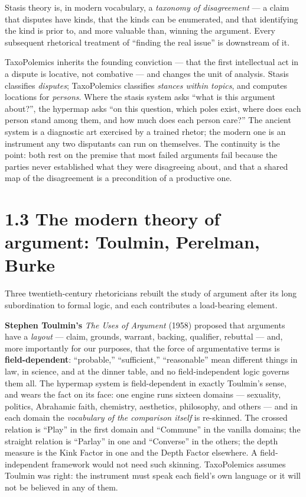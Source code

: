 Stasis theory is, in modern vocabulary, a \emph{taxonomy of
disagreement} --- a claim that disputes have kinds, that the kinds can
be enumerated, and that identifying the kind is prior to, and more
valuable than, winning the argument. Every subsequent rhetorical
treatment of ``finding the real issue'' is downstream of it.

TaxoPolemics inherits the founding conviction --- that the first
intellectual act in a dispute is locative, not combative --- and changes
the unit of analysis. Stasis classifies \emph{disputes}; TaxoPolemics
classifies \emph{stances within topics}, and computes locations for
\emph{persons}. Where the stasis system asks ``what is this argument
about?'', the hypermap asks ``on this question, which poles exist, where
does each person stand among them, and how much does each person care?''
The ancient system is a diagnostic art exercised by a trained rhetor;
the modern one is an instrument any two disputants can run on
themselves. The continuity is the point: both rest on the premise that
most failed arguments fail because the parties never established what
they were disagreeing about, and that a shared map of the disagreement
is a precondition of a productive one.

\section{1.3 The modern theory of argument: Toulmin, Perelman,
Burke}\label{the-modern-theory-of-argument-toulmin-perelman-burke}

Three twentieth-century rhetoricians rebuilt the study of argument after
its long subordination to formal logic, and each contributes a
load-bearing element.

\textbf{Stephen Toulmin's} \emph{The Uses of Argument} (1958) proposed
that arguments have a \emph{layout} --- claim, grounds, warrant,
backing, qualifier, rebuttal --- and, more importantly for our purposes,
that the force of argumentative terms is \textbf{field-dependent}:
``probable,'' ``sufficient,'' ``reasonable'' mean different things in
law, in science, and at the dinner table, and no field-independent logic
governs them all. The hypermap system is field-dependent in exactly
Toulmin's sense, and wears the fact on its face: one engine runs sixteen
domains --- sexuality, politics, Abrahamic faith, chemistry, aesthetics,
philosophy, and others --- and in each domain the \emph{vocabulary of
the comparison itself} is re-skinned. The crossed relation is ``Play''
in the first domain and ``Commune'' in the vanilla domains; the straight
relation is ``Parlay'' in one and ``Converse'' in the others; the depth
measure is the Kink Factor in one and the Depth Factor elsewhere. A
field-independent framework would not need such skinning. TaxoPolemics
assumes Toulmin was right: the instrument must speak each field's own
language or it will not be believed in any of them.

